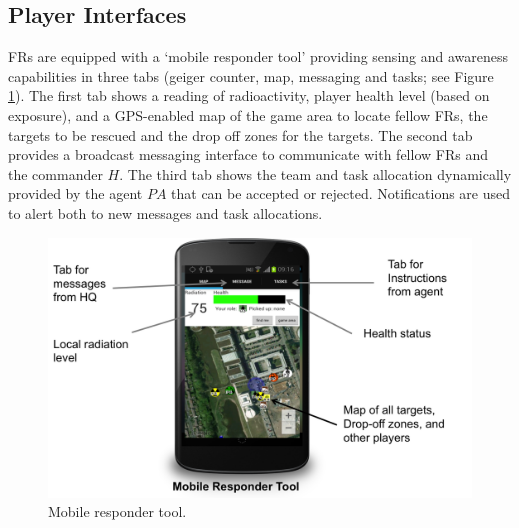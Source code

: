 \subsection{Player Interfaces}
\noindent FRs are equipped with a `mobile responder tool' providing sensing and awareness capabilities in three tabs (geiger cou\-nter, map, messaging and tasks; see Figure \ref{fig:ui}). The first tab shows a reading of radioactivity, player health level (based on exposure), and a GPS-enabled map of the game area to locate fellow FRs, the targets to be rescued and the drop off zones for the targets. The second tab provides a broadcast messaging interface to communicate with fellow FRs and the commander $H$. The third tab shows the team and task allocation dynamically provided by the agent $PA$ that can be accepted or rejected. Notifications are used to alert both to new messages and task allocations.

\begin{figure}[htbp]
\includegraphics[width=\columnwidth]{mobile_interface.png}
\caption{Mobile responder tool.}
\label{fig:ui}
\end{figure}


